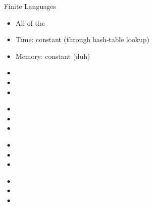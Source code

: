 \documentclass{beamer}
\begin{document}
\begin{frame}{Finite Languages}
\begin{block}{}
\begin{itemize}
	\item All of the 
	\item Time: constant (through hash-table lookup)
	\item Memory: constant (duh)
\end{itemize}
\end{block}
\end{frame}


\begin{frame}{}
\begin{block}{}
\begin{itemize}
	\item 
	\item 
	\item 
\end{itemize}
\end{block}
\end{frame}


\begin{frame}{}
\begin{block}{}
\begin{itemize}
	\item 
	\item 
	\item 
\end{itemize}
\end{block}
\end{frame}


\begin{frame}{}
\begin{block}{}
\begin{itemize}
	\item 
	\item 
	\item 
\end{itemize}
\end{block}
\end{frame}


\begin{frame}{}
\begin{block}{}
\begin{itemize}
	\item 
	\item 
	\item 
\end{itemize}
\end{block}
\end{frame}
\end{document}
